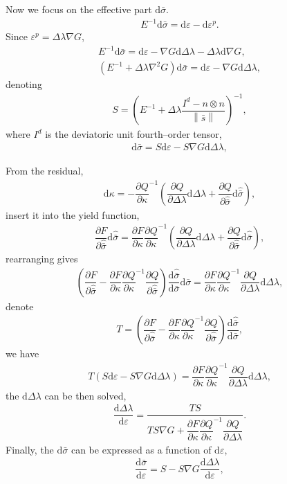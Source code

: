\documentclass[5p]{elsarticle}
\newcommand*{\md}[1]{\mathrm{d}#1}
\newcommand*{\norm}[1]{\left\lVert#1\right\rVert}
\newcommand*{\pdfrac}[2]{\dfrac{\partial#1}{\partial#2}}
\newcommand*{\ddfrac}[2]{\dfrac{\md#1}{\md#2}}
\begin{document}
Now we focus on the effective part $\md{\bar{\sigma}}$.
\begin{gather*}
E^{-1}\md{\bar{\sigma}}=\md{\varepsilon}-\md{\varepsilon^p}.
\end{gather*}
Since $\varepsilon^p=\Delta\lambda{}\nabla{}G$,
\begin{gather*}
E^{-1}\md{\bar{\sigma}}=\md{\varepsilon}-\nabla{}G\md{\Delta\lambda}-\Delta\lambda\md{\nabla{}G},\\
\left(E^{-1}+\Delta\lambda\nabla^2G\right)\md{\bar{\sigma}}=\md{\varepsilon}-\nabla{}G\md{\Delta\lambda},
\end{gather*}
denoting
\begin{gather}
S=\left(E^{-1}+\Delta\lambda\dfrac{I^d-n\otimes{}n}{\norm{\bar{s}}}\right)^{-1},
\end{gather}
where $I^d$ is the deviatoric unit fourth--order tensor,
\begin{gather*}
\md{\bar{\sigma}}=S\md{\varepsilon}-S\nabla{}G\md{\Delta\lambda},
\end{gather*}

From the residual,
\begin{gather*}
\md{\kappa}=-\pdfrac{Q}{\kappa}^{-1}\left(\pdfrac{Q}{\Delta\lambda}\md{\Delta\lambda}+\pdfrac{Q}{\hat{\bar{\sigma}}}\md{\hat{\bar{\sigma}}}\right),
\end{gather*}
insert it into the yield function,
\begin{gather*}
\pdfrac{F}{\hat{\bar{\sigma}}}\md{\hat{\bar{\sigma}}}=\pdfrac{F}{\kappa}\pdfrac{Q}{\kappa}^{-1}\left(\pdfrac{Q}{\Delta\lambda}\md{\Delta\lambda}+\pdfrac{Q}{\hat{\bar{\sigma}}}\md{\hat{\bar{\sigma}}}\right),
\end{gather*}
rearranging gives
\begin{gather*}
\left(\pdfrac{F}{\hat{\bar{\sigma}}}-\pdfrac{F}{\kappa}\pdfrac{Q}{\kappa}^{-1}\pdfrac{Q}{\hat{\bar{\sigma}}}\right)\ddfrac{\hat{\bar{\sigma}}}{\bar{\sigma}}\md{\bar{\sigma}}=\pdfrac{F}{\kappa}\pdfrac{Q}{\kappa}^{-1}\pdfrac{Q}{\Delta\lambda}\md{\Delta\lambda},
\end{gather*}
denote
\begin{gather}
T=\left(\pdfrac{F}{\hat{\bar{\sigma}}}-\pdfrac{F}{\kappa}\pdfrac{Q}{\kappa}^{-1}\pdfrac{Q}{\hat{\bar{\sigma}}}\right)\ddfrac{\hat{\bar{\sigma}}}{\bar{\sigma}},
\end{gather}
we have
\begin{gather*}
T\left(S\md{\varepsilon}-S\nabla{}G\md{\Delta\lambda}\right)=\pdfrac{F}{\kappa}\pdfrac{Q}{\kappa}^{-1}\pdfrac{Q}{\Delta\lambda}\md{\Delta\lambda},
\end{gather*}
the $\md{\Delta\lambda}$ can be then solved,
\begin{gather}
\ddfrac{\Delta\lambda}{\varepsilon}=\dfrac{TS}{TS\nabla{}G+\pdfrac{F}{\kappa}\pdfrac{Q}{\kappa}^{-1}\pdfrac{Q}{\Delta\lambda}}.
\end{gather}
Finally, the $\md{\bar{\sigma}}$ can be expressed as a function of $\md{\varepsilon}$,
\begin{gather}
\ddfrac{\bar{\sigma}}{\varepsilon}=S-S\nabla{}G\ddfrac{\Delta\lambda}{\varepsilon},
\end{gather}
\end{document}
